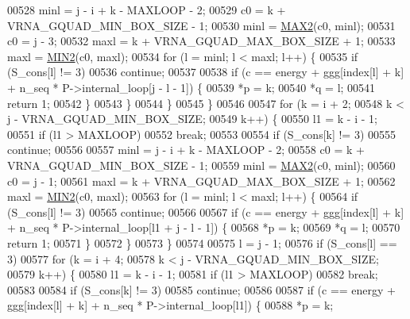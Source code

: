 \begin{DoxyCode}
00528       minl  = j - i + k - MAXLOOP - 2;
00529       c0    = k + VRNA\_GQUAD\_MIN\_BOX\_SIZE - 1;
00530       minl  = \hyperlink{group__utils_ga33297b3679c713b0c4d897cd0fe3b122}{MAX2}(c0, minl);
00531       c0    = j - 3;
00532       maxl  = k + VRNA\_GQUAD\_MAX\_BOX\_SIZE + 1;
00533       maxl  = \hyperlink{group__utils_gae0b9cd0ce090bd69b951aa73e8fa4f7d}{MIN2}(c0, maxl);
00534       \textcolor{keywordflow}{for} (l = minl; l < maxl; l++) \{
00535         \textcolor{keywordflow}{if} (S\_cons[l] != 3)
00536           \textcolor{keywordflow}{continue};
00537 
00538         \textcolor{keywordflow}{if} (c == energy + ggg[index[l] + k] + n\_seq * P->internal\_loop[j - l - 1]) \{
00539           *p  = k;
00540           *q  = l;
00541           \textcolor{keywordflow}{return} 1;
00542         \}
00543       \}
00544     \}
00545   \}
00546 
00547   \textcolor{keywordflow}{for} (k = i + 2;
00548        k < j - VRNA\_GQUAD\_MIN\_BOX\_SIZE;
00549        k++) \{
00550     l1 = k - i - 1;
00551     \textcolor{keywordflow}{if} (l1 > MAXLOOP)
00552       \textcolor{keywordflow}{break};
00553 
00554     \textcolor{keywordflow}{if} (S\_cons[k] != 3)
00555       \textcolor{keywordflow}{continue};
00556 
00557     minl  = j - i + k - MAXLOOP - 2;
00558     c0    = k + VRNA\_GQUAD\_MIN\_BOX\_SIZE - 1;
00559     minl  = \hyperlink{group__utils_ga33297b3679c713b0c4d897cd0fe3b122}{MAX2}(c0, minl);
00560     c0    = j - 1;
00561     maxl  = k + VRNA\_GQUAD\_MAX\_BOX\_SIZE + 1;
00562     maxl  = \hyperlink{group__utils_gae0b9cd0ce090bd69b951aa73e8fa4f7d}{MIN2}(c0, maxl);
00563     \textcolor{keywordflow}{for} (l = minl; l < maxl; l++) \{
00564       \textcolor{keywordflow}{if} (S\_cons[l] != 3)
00565         \textcolor{keywordflow}{continue};
00566 
00567       \textcolor{keywordflow}{if} (c == energy + ggg[index[l] + k] + n\_seq * P->internal\_loop[l1 + j - l - 1]) \{
00568         *p  = k;
00569         *q  = l;
00570         \textcolor{keywordflow}{return} 1;
00571       \}
00572     \}
00573   \}
00574 
00575   l = j - 1;
00576   \textcolor{keywordflow}{if} (S\_cons[l] == 3)
00577     \textcolor{keywordflow}{for} (k = i + 4;
00578          k < j - VRNA\_GQUAD\_MIN\_BOX\_SIZE;
00579          k++) \{
00580       l1 = k - i - 1;
00581       \textcolor{keywordflow}{if} (l1 > MAXLOOP)
00582         \textcolor{keywordflow}{break};
00583 
00584       \textcolor{keywordflow}{if} (S\_cons[k] != 3)
00585         \textcolor{keywordflow}{continue};
00586 
00587       \textcolor{keywordflow}{if} (c == energy + ggg[index[l] + k] + n\_seq * P->internal\_loop[l1]) \{
00588         *p  = k;

\end{DoxyCode}
